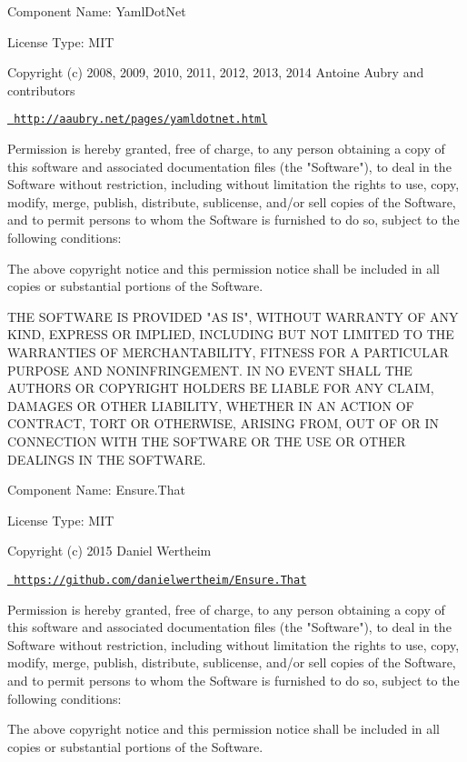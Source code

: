  Component Name\+: Yaml\+Dot\+Net

License Type\+: MIT

Copyright (c) 2008, 2009, 2010, 2011, 2012, 2013, 2014 Antoine Aubry and contributors

\href{http://aaubry.net/pages/yamldotnet.html}{\texttt{ http\+://aaubry.\+net/pages/yamldotnet.\+html}}

Permission is hereby granted, free of charge, to any person obtaining a copy of this software and associated documentation files (the "{}\+Software"{}), to deal in the Software without restriction, including without limitation the rights to use, copy, modify, merge, publish, distribute, sublicense, and/or sell copies of the Software, and to permit persons to whom the Software is furnished to do so, subject to the following conditions\+:

The above copyright notice and this permission notice shall be included in all copies or substantial portions of the Software.

THE SOFTWARE IS PROVIDED "{}\+AS IS"{}, WITHOUT WARRANTY OF ANY KIND, EXPRESS OR IMPLIED, INCLUDING BUT NOT LIMITED TO THE WARRANTIES OF MERCHANTABILITY, FITNESS FOR A PARTICULAR PURPOSE AND NONINFRINGEMENT. IN NO EVENT SHALL THE AUTHORS OR COPYRIGHT HOLDERS BE LIABLE FOR ANY CLAIM, DAMAGES OR OTHER LIABILITY, WHETHER IN AN ACTION OF CONTRACT, TORT OR OTHERWISE, ARISING FROM, OUT OF OR IN CONNECTION WITH THE SOFTWARE OR THE USE OR OTHER DEALINGS IN THE SOFTWARE.

 Component Name\+: Ensure.\+That

License Type\+: MIT

Copyright (c) 2015 Daniel Wertheim

\href{https://github.com/danielwertheim/Ensure.That}{\texttt{ https\+://github.\+com/danielwertheim/\+Ensure.\+That}}

Permission is hereby granted, free of charge, to any person obtaining a copy of this software and associated documentation files (the "{}\+Software"{}), to deal in the Software without restriction, including without limitation the rights to use, copy, modify, merge, publish, distribute, sublicense, and/or sell copies of the Software, and to permit persons to whom the Software is furnished to do so, subject to the following conditions\+:

The above copyright notice and this permission notice shall be included in all copies or substantial portions of the Software.

